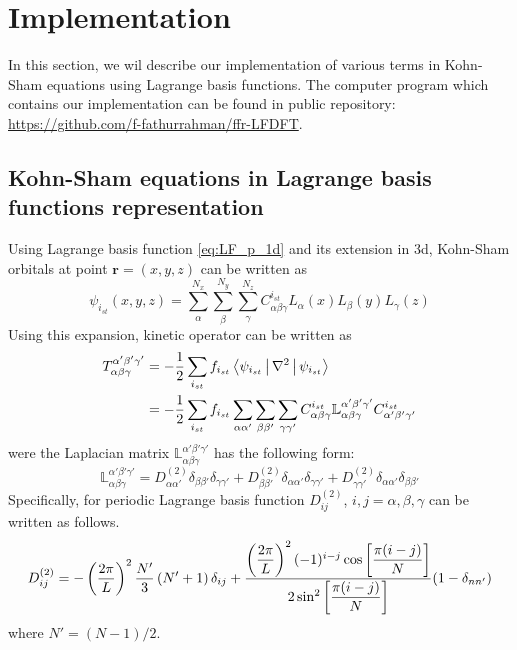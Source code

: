 \section{Implementation}

In this section, we wil describe our implementation of various terms 
in Kohn-Sham equations using Lagrange basis functions.
The computer program which contains our implementation can be found in public
repository: \url{https://github.com/f-fathurrahman/ffr-LFDFT}.

\subsection{Kohn-Sham equations in Lagrange basis functions representation}

Using Lagrange basis function \ref{eq:LF_p_1d} and its extension in 3d, Kohn-Sham orbitals
at point $\mathbf{r} = (x,y,z)$ can be written as
\begin{equation}
\psi_{i_{st}}(x,y,z) = \sum_{\alpha}^{N_x} \sum_{\beta}^{N_y} \sum_{\gamma}^{N_z}
C_{\alpha\beta\gamma}^{i_{st}} L_{\alpha}(x) L_{\beta}(y) L_{\gamma}(z)
\end{equation}
%
Using this expansion, kinetic operator can be written as
\begin{align}
T_{\alpha\beta\gamma}^{\alpha'\beta'\gamma'} & = -\frac{1}{2} \sum_{i_{st}} f_{i_{st}}
\Braket{ \psi_{i_{st}} | \nabla^2 | \psi_{i_{st}} } \\
& =
-\frac{1}{2}
\sum_{i_{st}} f_{i_{st}} \sum_{\alpha\alpha'} \sum_{\beta\beta'} \sum_{\gamma\gamma'}
C^{i_{st}}_{\alpha\beta\gamma} \mathbb{L}_{\alpha\beta\gamma}^{\alpha'\beta'\gamma'}
C^{i_{st}}_{\alpha'\beta'\gamma'}
\end{align}
%
were the Laplacian matrix $\mathbb{L}_{\alpha\beta\gamma}^{\alpha'\beta'\gamma'}$
has the following form:
\begin{equation}
\mathbb{L}_{\alpha\beta\gamma}^{\alpha'\beta'\gamma'} =
D^{(2)}_{\alpha\alpha'}\delta_{\beta\beta'}\delta_{\gamma\gamma'} +
D^{(2)}_{\beta\beta'}\delta_{\alpha\alpha'}\delta_{\gamma\gamma'} +
D^{(2)}_{\gamma\gamma'}\delta_{\alpha\alpha'}\delta_{\beta\beta'}
\label{eq:Laplace3d}
\end{equation}
%
Specifically, for periodic Lagrange basis function $D^{(2)}_{ij}$, $i, j = \alpha, \beta, \gamma$
can be written as follows.
\begin{equation}
D^{(2)}_{ij} = -\left( \frac{2\pi}{L} \right)^2 \frac{N'}{3} \left( N' + 1 \right) \delta_{ij} \\
+ \dfrac{ \left(\dfrac{2\pi}{L}\right)^2 (-1)^{i-j}\cos\left[\dfrac{\pi(i-j)}{N}\right]}
{2\sin^2\left[\dfrac{\pi(i-j)}{N}\right]}
(1-\delta_{nn'})
\label{eq:kin1d_p}
\end{equation}
where $N' = (N-1)/2$.

